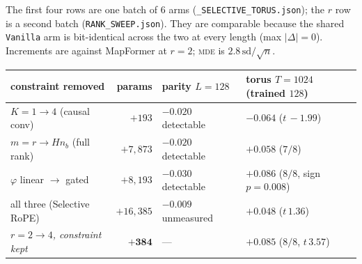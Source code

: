 \documentclass[11pt]{article}
\newcommand{\nb}{n_b}
\begin{document}
The first four rows are one batch of $6$ arms
(\texttt{\_SELECTIVE\_TORUS.json}); the $r$ row is a second batch
(\texttt{RANK\_SWEEP.json}). They are comparable because the shared \texttt{Vanilla}
arm is bit-identical across the two at every length (max $|\Delta| = 0$). Increments are
against MapFormer at $r=2$; \textsc{mde} is $2.8\,\mathrm{sd}/\sqrt{n}$.

\begin{center}\small
\begin{tabular}{lrll}
\toprule
constraint removed & params & parity $L{=}128$ & torus $T{=}1024$ (trained $128$) \\
\midrule
$K=1 \to 4$ (causal conv)      & $+193$    & $-0.020$ detectable & $-0.064$ ($t\,{-}1.99$) \\
$m = r \to H\nb$ (full rank)   & $+7{,}873$ & $-0.020$ detectable & $+0.058$ ($7/8$) \\
$\varphi$ linear $\to$ gated   & $+8{,}193$ & $-0.030$ detectable & $+0.086$ ($8/8$, sign $p{=}0.008$) \\
all three (Selective RoPE)     & $+16{,}385$& $-0.009$ unmeasured & $+0.048$ ($t\,1.36$) \\
\midrule
\emph{$r=2\to4$, constraint kept} & $\mathbf{+384}$ & --- & $\mathbf{+0.085}$ ($8/8$, $t\,3.57$) \\
\bottomrule
\end{tabular}
\end{center}
\end{document}
